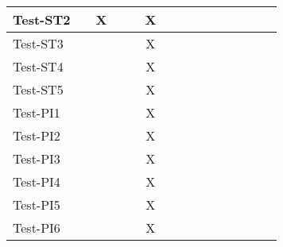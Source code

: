 \documentclass[12pt, titlepage]{article}
\begin{document}
\begin{table}[H]
\begin{adjustwidth}{-0.3in}{-0.5in}
{\begin{tabular}{c|c|c|c|c|c|c|c|c|c|c|c|c|c|c|}
\multicolumn{1}{|l|}{{Test-ST2}}   &             &         X    &             &             &     X        &             &             &             &              &              &              &             &  &                    \\ \hline
\multicolumn{1}{|l|}{{Test-ST3}}   &             &             &             &             &     X        &             &             &             &              &              &              &             &  &                    \\ \hline
\multicolumn{1}{|l|}{{Test-ST4}}   &             &             &             &             &     X        &             &             &             &              &              &              &             &  &                    \\ \hline
\multicolumn{1}{|l|}{{Test-ST5}}   &             &             &             &             &      X       &             &             &             &              &              &              &             &  &                    \\ \hline
\multicolumn{1}{|l|}{{Test-PI1}}   &             &             &             &             &     X        &             &             &             &              &              &              &             &  &                    \\ \hline
\multicolumn{1}{|l|}{{Test-PI2}}   &             &             &             &             &     X        &             &             &             &              &              &              &             &  &                    \\ \hline
\multicolumn{1}{|l|}{{Test-PI3}}   &             &             &             &             &      X       &             &             &             &              &              &              &             &  &                    \\ \hline
\multicolumn{1}{|l|}{{Test-PI4}}   &             &             &             &             &     X        &             &             &             &              &              &              &             &  &                    \\ \hline
\multicolumn{1}{|l|}{{Test-PI5}}   &             &             &             &             &     X        &             &             &             &              &              &              &             &  &                    \\ \hline
\multicolumn{1}{|l|}{{Test-PI6}}   &             &             &             &             &     X        &             &             &             &              &              &              &             &  &                    \\ \hline

\end{tabular}}
\end{adjustwidth}
\end{table}
\end{document}
